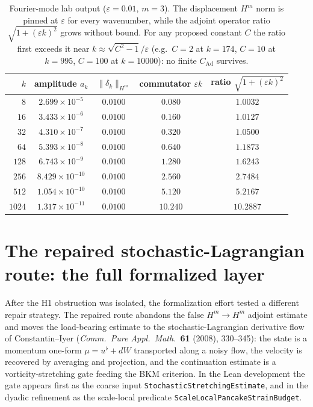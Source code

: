 \documentclass[11pt]{article}
\theoremstyle{definition}
\newcommand{\Hm}{H^m}
\newcommand{\CAd}{C_{\mathrm{Ad}}}
\begin{document}
\begin{table}[h]
\centering
\begin{tabular}{rcccc}
\toprule
$k$ & amplitude $a_k$ & $\|\delta_k\|_{\Hm}$ & commutator $\varepsilon k$ & ratio $\sqrt{1+(\varepsilon k)^2}$ \\
\midrule
$8$    & $2.699\times10^{-5}$ & $0.0100$ & $0.080$ & $1.0032$ \\
$16$   & $3.433\times10^{-6}$ & $0.0100$ & $0.160$ & $1.0127$ \\
$32$   & $4.310\times10^{-7}$ & $0.0100$ & $0.320$ & $1.0500$ \\
$64$   & $5.393\times10^{-8}$ & $0.0100$ & $0.640$ & $1.1873$ \\
$128$  & $6.743\times10^{-9}$ & $0.0100$ & $1.280$ & $1.6243$ \\
$256$  & $8.429\times10^{-10}$ & $0.0100$ & $2.560$ & $2.7484$ \\
$512$  & $1.054\times10^{-10}$ & $0.0100$ & $5.120$ & $5.2167$ \\
$1024$ & $1.317\times10^{-11}$ & $0.0100$ & $10.240$ & $10.2887$ \\
\bottomrule
\end{tabular}
\caption{Fourier-mode lab output ($\varepsilon=0.01$, $m=3$). The displacement
$\Hm$ norm is pinned at $\varepsilon$ for every wavenumber, while the adjoint
operator ratio $\sqrt{1+(\varepsilon k)^2}$ grows without bound. For any
proposed constant $C$ the ratio first exceeds it near
$k\approx\sqrt{C^2-1}/\varepsilon$ (e.g.\ $C=2$ at $k=174$, $C=10$ at $k=995$,
$C=100$ at $k=10000$): no finite $\CAd$ survives.}
\label{tab:lab}
\end{table}

\section{The repaired stochastic-Lagrangian route: the full formalized layer}
\label{sec:repair}

After the H1 obstruction was isolated, the formalization effort tested a
different repair strategy.  The repaired route abandons the false
$\Hm\to\Hm$ adjoint estimate and moves the load-bearing estimate to the
stochastic-Lagrangian derivative flow of Constantin--Iyer (\emph{Comm.\ Pure
Appl.\ Math.}\ \textbf{61} (2008), 330--345): the state is a momentum
one-form $\mu = u^\flat + dW$ transported along a noisy flow, the velocity is
recovered by averaging and projection, and the continuation estimate is a
vorticity-stretching gate feeding the BKM criterion.  In the Lean development
the gate appears first as the coarse input
\texttt{StochasticStretchingEstimate}, and in the dyadic refinement as the
scale-local predicate \texttt{ScaleLocalPancakeStrainBudget}.
\end{document}
